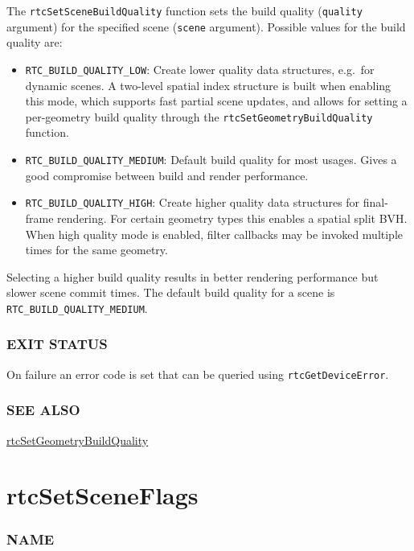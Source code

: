 The \texttt{rtcSetSceneBuildQuality} function sets the build quality
(\texttt{quality} argument) for the specified scene (\texttt{scene}
argument). Possible values for the build quality are:

\begin{itemize}
\item
  \texttt{RTC\_BUILD\_QUALITY\_LOW}: Create lower quality data
  structures, e.g.~for dynamic scenes. A two-level spatial index
  structure is built when enabling this mode, which supports fast
  partial scene updates, and allows for setting a per-geometry build
  quality through the \texttt{rtcSetGeometryBuildQuality} function.
\item
  \texttt{RTC\_BUILD\_QUALITY\_MEDIUM}: Default build quality for most
  usages. Gives a good compromise between build and render performance.
\item
  \texttt{RTC\_BUILD\_QUALITY\_HIGH}: Create higher quality data
  structures for final-frame rendering. For certain geometry types this
  enables a spatial split BVH. When high quality mode is enabled, filter
  callbacks may be invoked multiple times for the same geometry.
\end{itemize}

Selecting a higher build quality results in better rendering performance
but slower scene commit times. The default build quality for a scene is
\texttt{RTC\_BUILD\_QUALITY\_MEDIUM}.

\subsubsection{EXIT STATUS}\label{exit-status}

On failure an error code is set that can be queried using
\texttt{rtcGetDeviceError}.

\subsubsection{SEE ALSO}\label{see-also}

\hyperref[rtcsetgeometrybuildquality]{rtcSetGeometryBuildQuality}

\pagebreak

\section{rtcSetSceneFlags}\label{rtcsetsceneflags}

\subsubsection{NAME}\label{name}

